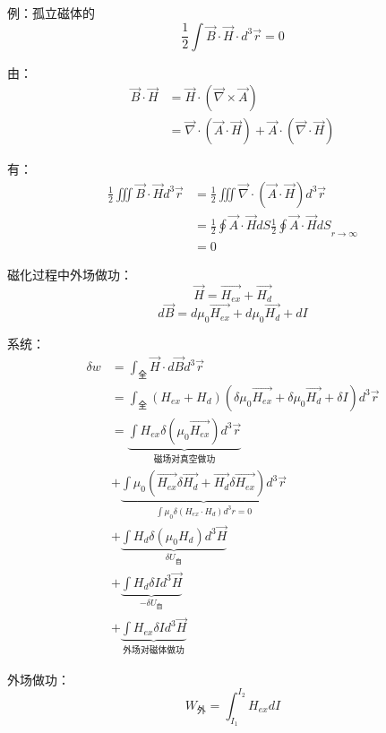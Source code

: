 例：孤立磁体的 
\[\frac{1}{2} \int \vec{B} \cdot \vec{H} \cdot d^3\vec{r} = 0\]

由：
\begin{align*}
    \vec{B} \cdot \vec{H} 
    &= \vec{H} \cdot (\vec{\nabla} \times \vec{A})\\
    &= \vec{\nabla} \cdot (\vec{A} \cdot \vec{H})
        + \vec{A} \cdot (\vec{\nabla} \cdot \vec{H})
\end{align*}

有：
\begin{align*}
    \frac{1}{2}\iiint\vec{B} \cdot \vec{H} d^3\vec{r}
    &=  \frac{1}{2}\iiint\vec{\nabla} \cdot (\vec{A} \cdot \vec{H})
        d^3\vec{r}\\
    &=  \frac{1}{2}\oint \vec{A} \cdot \vec{H} dS
        {\frac{1}{2}\oint \vec{A} \cdot \vec{H} dS}_{r\to \infty}\\
    &= 0
\end{align*}

磁化过程中外场做功：
\[ \vec{H} = \vec{H_{ex}} + \vec{H_d} \]
\[ d\vec{B} = d\mu_0\vec{H_{ex}} + d\mu_0\vec{H_d} + dI \]

系统：
\begin{align*}
    \delta w 
    &= \int_\text{全} \vec{H} \cdot d\vec{B} d^3 \vec{r}\\
    &= \int_\text{全} (H_{ex}+H_d)(\delta \mu_0 \vec{H_{ex}} 
        + \delta \mu_0 \vec{H_{d}} + \delta I) d^3 \vec{r}\\
    &= \underbrace{\int H_{ex} \delta(\mu_0 \vec{H_{ex}}) d^3\vec{r}}
        _\text{磁场对真空做功}\\
    &+ \underbrace{\int\mu_0 (\vec{H_{ex}}\delta\vec{H_d} + 
       \vec{H_d} \delta \vec{H_{ex}}) d^3 \vec{r}}
        _{\int\mu_0\delta(H_{ex} \cdot H_d) d^3 r = 0}\\
    &+ \underbrace{\int H_d\delta(\mu_0H_d)d^3\vec{H}}
        _{\delta U_\text{自}}\\
    &+ \underbrace{ \int H_d \delta I d^3\vec{H}}
        _{-\delta U_\text{自}}\\
    &+ \underbrace{\int H_{ex}\delta I d^3\vec{H}}
        _\text{外场对磁体做功}
\end{align*}

外场做功：
\[ W_\text{外} = \int^{I_2}_{I_1}H_{ex}dI\]



